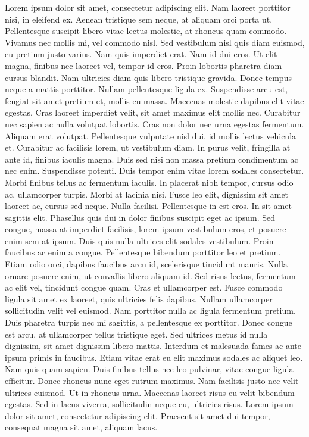 \documentclass[../../main.tex]{subfiles}
\begin{document}
Lorem ipsum dolor sit amet, consectetur adipiscing elit. Nam laoreet porttitor nisi, in eleifend ex. Aenean tristique sem neque, at aliquam orci porta ut. Pellentesque suscipit libero vitae lectus molestie, at rhoncus quam commodo. Vivamus nec mollis mi, vel commodo nisl. Sed vestibulum nisl quis diam euismod, eu pretium justo varius. Nam quis imperdiet erat. Nam id dui eros. Ut elit magna, finibus nec laoreet vel, tempor id eros.
Proin lobortis pharetra diam cursus blandit. Nam ultricies diam quis libero tristique gravida. Donec tempus neque a mattis porttitor. Nullam pellentesque ligula ex. Suspendisse arcu est, feugiat sit amet pretium et, mollis eu massa. Maecenas molestie dapibus elit vitae egestas. Cras laoreet imperdiet velit, sit amet maximus elit mollis nec. Curabitur nec sapien ac nulla volutpat lobortis. Cras non dolor nec urna egestas fermentum. Aliquam erat volutpat. Pellentesque vulputate nisl dui, id mollis lectus vehicula et. Curabitur ac facilisis lorem, ut vestibulum diam. In purus velit, fringilla at ante id, finibus iaculis magna. Duis sed nisi non massa pretium condimentum ac nec enim. Suspendisse potenti. Duis tempor enim vitae lorem sodales consectetur.
Morbi finibus tellus ac fermentum iaculis. In placerat nibh tempor, cursus odio ac, ullamcorper turpis. Morbi at lacinia nisi. Fusce leo elit, dignissim sit amet laoreet ac, cursus sed neque. Nulla facilisi. Pellentesque in est eros. In sit amet sagittis elit. Phasellus quis dui in dolor finibus suscipit eget ac ipsum. Sed congue, massa at imperdiet facilisis, lorem ipsum vestibulum eros, et posuere enim sem at ipsum. Duis quis nulla ultrices elit sodales vestibulum. Proin faucibus ac enim a congue. Pellentesque bibendum porttitor leo et pretium. Etiam odio orci, dapibus faucibus arcu id, scelerisque tincidunt mauris.
Nulla ornare posuere enim, ut convallis libero aliquam id. Sed risus lectus, fermentum ac elit vel, tincidunt congue quam. Cras et ullamcorper est. Fusce commodo ligula sit amet ex laoreet, quis ultricies felis dapibus. Nullam ullamcorper sollicitudin velit vel euismod. Nam porttitor nulla ac ligula fermentum pretium. Duis pharetra turpis nec mi sagittis, a pellentesque ex porttitor. Donec congue est arcu, at ullamcorper tellus tristique eget. Sed ultrices metus id nulla dignissim, sit amet dignissim libero mattis. Interdum et malesuada fames ac ante ipsum primis in faucibus. Etiam vitae erat eu elit maximus sodales ac aliquet leo. Nam quis quam sapien.
Duis finibus tellus nec leo pulvinar, vitae congue ligula efficitur. Donec rhoncus nunc eget rutrum maximus. Nam facilisis justo nec velit ultrices euismod. Ut in rhoncus urna. Maecenas laoreet risus eu velit bibendum egestas. Sed in lacus viverra, sollicitudin neque eu, ultricies risus. Lorem ipsum dolor sit amet, consectetur adipiscing elit. Praesent sit amet dui tempor, consequat magna sit amet, aliquam lacus. 
\end{document}

